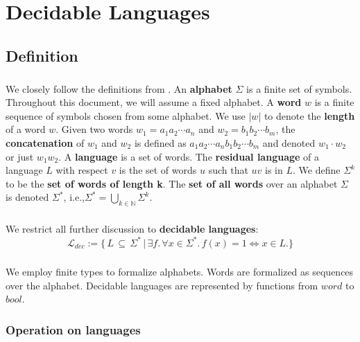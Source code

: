 \chapter{Decidable Languages}

\section{Definition}
\paragraph{}
We closely follow the definitions from \cite{DBLP:books/daglib/0011126}.
An \textbf{alphabet} $\Sigma$ is a finite set of symbols. Throughout this document, we will assume a fixed alphabet.
A \textbf{word} $w$ is a finite sequence of symbols chosen from some alphabet. 
We use $|w|$ to denote the \textbf{length} of a word $w$. 
Given two words $w_1 = a_1 a_2 \cdots a_n$ and $w_2 = b_1 b_2 \cdots b_m$, the \textbf{concatenation} of $w_1$ and $w_2$ is defined as $a_1 a_2 \cdots a_n b_1 b_2 \cdots b_m$ and denoted $w_1 \cdot w_2$ or just $w_1 w_2$.
A \textbf{language} is a set of words.
The \textbf{residual language} of a language $L$ with respect $v$ is the set of words $u$ such that $u v$ is in $L$.
We define $\Sigma^k$ to be the \textbf{set of words of length k}.
The \textbf{set of all words} over an alphabet $\Sigma$ is denoted $\Sigma^*$, i.e.,$\Sigma^* = \bigcup_{k \in \mathbb{N}} \Sigma^k$.

\paragraph{} We restrict all further discussion to \textbf{decidable languages}:
\begin{equation*} \mathcal{L}_{dec} := \{ \, L \, \subseteq \, \Sigma^* \, 
    \vert \, \exists f. \, \forall x \in \Sigma^*. \, f(x) = 1 \Leftrightarrow  x \in L. \} \end{equation*} 

    \paragraph{} 
    We employ finite types to formalize alphabets. 
    Words are formalized as sequences over the alphabet.
    Decidable languages are represented by functions from $word$ to $bool$.

    \subsection{Operation on languages}

